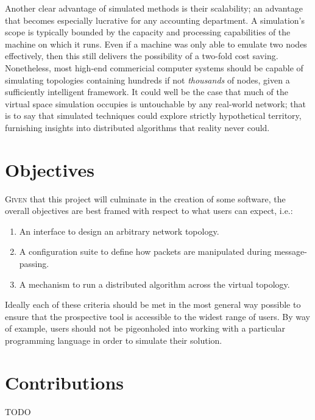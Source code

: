 Another clear advantage of simulated methods is their scalability; an advantage that becomes especially lucrative for
any accounting department. A simulation's scope is typically bounded by the capacity and processing capabilities of
the machine on which it runs. Even if a machine was only able to emulate two nodes effectively, then this still
delivers the possibility of a two-fold cost saving. Nonetheless, most high-end commericial computer systems should be
capable of simulating topologies containing hundreds if not \emph{thousands} of nodes, given a sufficiently
intelligent framework. It could well be the case that much of the virtual space simulation occupies is untouchable by
any real-world network; that is to say that simulated techniques could explore strictly hypothetical territory,
furnishing insights into distributed algorithms that reality never could.


\section{Objectives}

\lettrine{G}{iven} that this project will culminate in the creation of some software, the overall objectives are best
framed with respect to what users can expect, i.e.:
\begin{enumerate}
    \item An interface to design an arbitrary network topology.
    \item A configuration suite to define how packets are manipulated during message-passing.
    \item A mechanism to run a distributed algorithm across the virtual topology.
\end{enumerate}

Ideally each of these criteria should be met in the most general way possible to ensure that the prospective tool is
accessible to the widest range of users. By way of example, users should not be pigeonholed into working with a
particular programming language in order to simulate their solution.


\section{Contributions}

TODO
